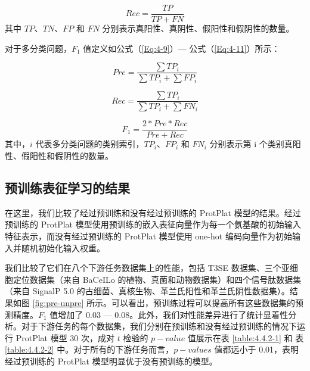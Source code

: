 \begin{equation}
    Rec = \frac{TP}{TP + FN}
\label{Eq:4-8}
\end{equation}
其中 $TP$、$TN$、$FP$ 和 $FN$ 分别表示真阳性、真阴性、假阳性和假阴性的数量。 

对于多分类问题，$F_1$ 值定义如公式（\ref{Eq:4-9}）— 公式（\ref{Eq:4-11}）所示：

\begin{equation}
    Pre = \frac{\sum TP_i}{\sum TP_i + \sum FP_i}
\label{Eq:4-9}
\end{equation}

\begin{equation}
    Rec = \frac{\sum TP_i}{\sum TP_i + \sum FN_i}
\label{Eq:4-10}
\end{equation}

\begin{equation}
    F_1 = \frac{2 * Pre * Rec}{Pre + Rec}
\label{Eq:4-11}
\end{equation}
其中，$i$ 代表多分类问题的类别索引，$TP_i$、$FP_i$ 和 $FN_i$ 分别表示第 i 个类别真阳性、假阳性和假阴性的数量。


\subsection{预训练表征学习的结果}
在这里，我们比较了经过预训练和没有经过预训练的 ProtPlat 模型的结果。经过预训练的 ProtPlat 模型使用预训练的嵌入表征向量作为每一个氨基酸的初始输入特征表示，而没有经过预训练的 ProtPlat 模型使用 one-hot 编码向量作为初始输入并随机初始化输入权重。

我们比较了它们在八个下游任务数据集上的性能，包括 T3SE 数据集、三个亚细胞定位数据集（来自 BaCeILo \cite{pierleoni2006bacello} 的植物、真菌和动物数据集）和四个信号肽数据集（来自 SignalP 5.0 \cite{armenteros2019signalp} 的古细菌、真核生物、革兰氏阳性和革兰氏阴性数据集）。结果如图 \ref{fig:pre-unpre} 所示。可以看出，预训练过程可以提高所有这些数据集的预测精度。$F_1$ 值增加了 0.03 — 0.08。此外，我们对性能差异进行了统计显着性分析。对于下游任务的每个数据集，我们分别在预训练和没有经过预训练的情况下运行 ProtPlat 模型 30 次，成对 $t$ 检验的 $p-value$ 值展示在表 \ref{table:4.4.2-1} 和 表 \ref{table:4.4.2-2} 中。对于所有的下游任务而言，$p-values$ 值都远小于 0.01，表明经过预训练的 ProtPlat 模型明显优于没有预训练的模型。

